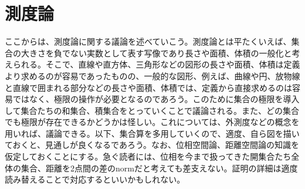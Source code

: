 \documentclass[a4paper]{jsarticle}
\begin{document}
\section{測度論}
ここからは、測度論に関する議論を述べていこう。測度論とは平たくいえば、集合の大きさを負でない実数として表す写像であり長さや面積、体積の一般化と考えられる。そこで、直線や直方体、三角形などの図形の長さや面積、体積は定義より求めるのが容易であったものの、一般的な図形、例えば、曲線や円、放物線と直線で囲まれる部分などの長さや面積、体積では、定義から直接求めるのは容易ではなく、極限の操作が必要となるのであろう。このために集合の極限を導入して集合たちの和集合、積集合をとっていくことで議論される。また、どの集合でも極限が存在できるかどうかは怪しい。これについては、外測度などの概念を用いれば、議論できる。以下、集合算を多用していくので、適度、自ら図を描いておくと、見通しが良くなるであろう。なお、位相空間論、距離空間論の知識を仮定しておくことにする。急ぐ読者には、位相を今まで扱ってきた開集合たち全体の集合、距離を2点間の差のnormだと考えても差支えない。証明の詳細は適度読み替えることで対応するといいかもしれない。
\end{document}

